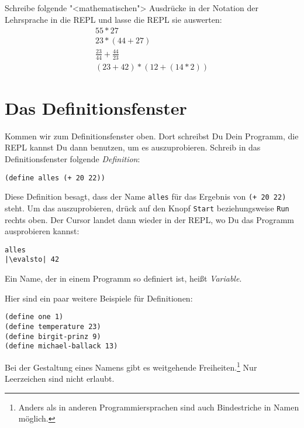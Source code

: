 \begin{aufgabeinline}
  Schreibe folgende "<mathematischen"> Ausdrücke in der Notation der
  Lehrsprache in die REPL und lasse die REPL sie auswerten:
  \begin{displaymath}
    \begin{array}{c}
      55 * 27\\
      23 * (44 + 27)\\
      \frac{23}{44} + \frac{44}{23}\\
      (23 + 42) * (12 + (14 * 2))
    \end{array}
  \end{displaymath}
\end{aufgabeinline}
%
\section{Das Definitionsfenster}

Kommen wir zum Definitionsfenster oben.  Dort schreibst Du Dein
Programm, die REPL kannst Du dann benutzen, um es auszuprobieren.
Schreib in das Definitionsfenster folgende
\textit{Definition}:
%
\begin{lstlisting}
(define alles (+ 20 22))
\end{lstlisting}
%
Diese Definition besagt, dass der Name \lstinline{alles} für das Ergebnis
von \lstinline{(+ 20 22)} steht.  Um das auszuprobieren, drück auf den
Knopf \texttt{Start} beziehungsweise \texttt{Run} rechts oben.  Der Cursor
landet dann wieder in der REPL, wo Du das Programm ausprobieren
kannst:
%
\begin{lstlisting}
alles
|\evalsto| 42
\end{lstlisting}
%
Ein Name, der in einem Programm so definiert ist, heißt
\textit{Variable}.

Hier sind ein paar weitere Beispiele für Definitionen:
%
\begin{lstlisting}
(define one 1)
(define temperature 23)
(define birgit-prinz 9)
(define michael-ballack 13)
\end{lstlisting}
%
Bei der Gestaltung eines Namens gibt es weitgehende
Freiheiten.\footnote{Anders als in anderen Programmiersprachen sind
  auch Bindestriche in Namen möglich.}  Nur Leerzeichen sind nicht
erlaubt.

